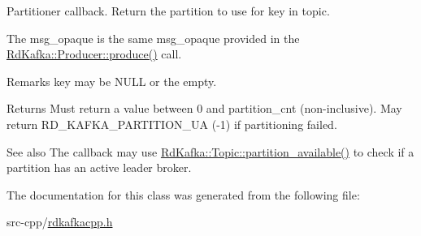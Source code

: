 Partitioner callback. Return the partition to use for {\ttfamily key} in {\ttfamily topic}.

The {\ttfamily msg\_\-opaque} is the same {\ttfamily msg\_\-opaque} provided in the \hyperlink{classRdKafka_1_1Producer_ab90a30c5e5fb006a3b4004dc4c9a7923}{RdKafka::Producer::produce()} call.

\begin{DoxyRemark}{Remarks}
{\ttfamily key} may be NULL or the empty.
\end{DoxyRemark}
\begin{DoxyReturn}{Returns}
Must return a value between 0 and {\ttfamily partition\_\-cnt} (non-\/inclusive). May return RD\_\-KAFKA\_\-PARTITION\_\-UA (-\/1) if partitioning failed.
\end{DoxyReturn}
\begin{DoxySeeAlso}{See also}
The callback may use \hyperlink{classRdKafka_1_1Topic_a8e2f4ce86845398312d319001462577c}{RdKafka::Topic::partition\_\-available()} to check if a partition has an active leader broker. 
\end{DoxySeeAlso}


The documentation for this class was generated from the following file:\begin{DoxyCompactItemize}
\item 
src-\/cpp/\hyperlink{rdkafkacpp_8h}{rdkafkacpp.h}\end{DoxyCompactItemize}
